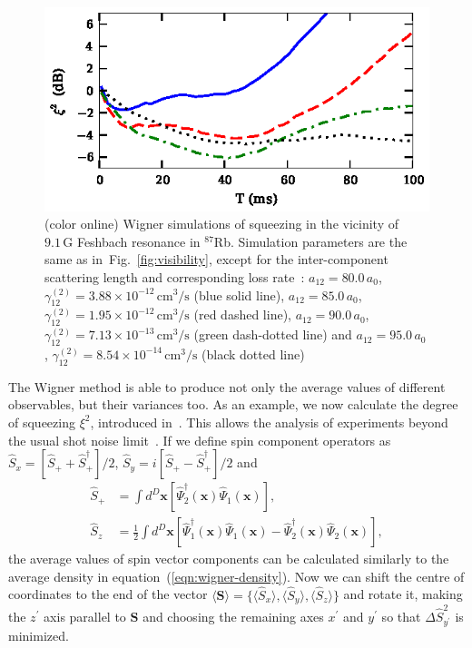 \documentclass[aps,prl,twocolumn,showpacs,amsmath,amssymb,superscriptaddress,flushbottom,noraggedfooter]{revtex4-1}
\newcommand{\Rb}{$^{87}$Rb}
\newcommand{\figref}[1]{Fig.~\ref{#1}}
\newcommand{\xvec}{\boldsymbol{x}}
\begin{document}
\begin{figure}
	\includegraphics{ramsey_squeezing.eps}

	\caption[]{(color online)
	Wigner simulations of squeezing in the vicinity of $9.1\,\mathrm{G}$ Feshbach resonance in \Rb.
	Simulation parameters are the same as in~\figref{fig:visibility},
	except for the inter-component scattering length and corresponding loss rate~\cite{Kaufman2009}:
	$a_{12} = 80.0\,a_0$, $\gamma^{(2)}_{12} = 3.88 \times 10^{-12}\,\mathrm{cm^3/s}$ (blue solid line),
	$a_{12} = 85.0\,a_0$, $\gamma^{(2)}_{12} = 1.95 \times 10^{-12}\,\mathrm{cm^3/s}$ (red dashed line),
	$a_{12} = 90.0\,a_0$, $\gamma^{(2)}_{12} = 7.13 \times 10^{-13}\,\mathrm{cm^3/s}$ (green dash-dotted line) and
	$a_{12} = 95.0\,a_0$, $\gamma^{(2)}_{12} = 8.54 \times 10^{-14}\,\mathrm{cm^3/s}$ (black dotted line)}

	\label{fig:squeezing}
\end{figure}

The Wigner method is able to produce not only the average values of different observables,
but their variances too.
As an example, we now calculate the degree of squeezing $\xi^2$, introduced in~\cite{Wineland1994,Sorensen2001}.
This allows the analysis of experiments beyond the usual shot noise limit~\cite{Riedel2010,Gross2010}.
If we define spin component operators as
$\hat{S}_{x} = [ \hat{S}_+ + \hat{S}_+^\dagger ] / 2 $,
$\hat{S}_{y} = i [ \hat{S}_+ - \hat{S}_+^\dagger ] / 2 $ and
\begin{equation}
\begin{split}
	\hat{S}_+ & = \int d^D\xvec \left[
		\widehat{\Psi}^\dagger_2 (\xvec) \widehat{\Psi}_1 (\xvec)
	\right], \\
	\hat{S}_z & = \frac{1}{2} \int d^D\xvec \left[
		\widehat{\Psi}^\dagger_1 (\xvec) \widehat{\Psi}_1 (\xvec)
		- \widehat{\Psi}^\dagger_2 (\xvec) \widehat{\Psi}_2 (\xvec)
	\right],
\end{split}
\end{equation}
the average values of spin vector components can be calculated similarly to the average density in
equation~(\ref{eqn:wigner-density}).
Now we can shift the centre of coordinates to the end of the vector
$\langle \boldsymbol{S} \rangle = \{ \langle \hat{S}_x \rangle, \langle \hat{S}_y \rangle, \langle \hat{S}_z \rangle \}$
and rotate it, making the $z^\prime$ axis parallel to $\boldsymbol{S}$ and choosing the remaining axes $x^\prime$ and $y^\prime$ so that
$\Delta \hat{S}^2_{y^\prime} $ is minimized.
\end{document}
